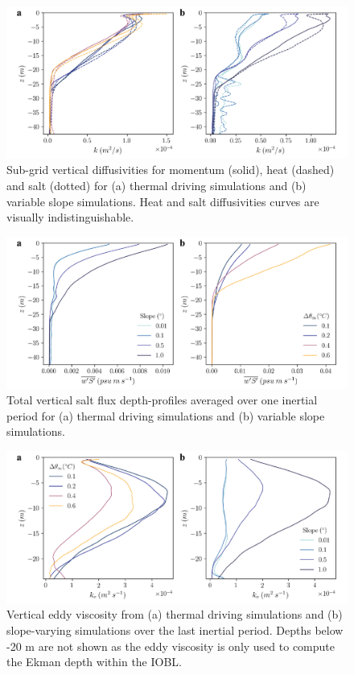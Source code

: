 \documentclass[tc, manuscript]{copernicus}
\begin{document}
\begin{figure}[t]
\includegraphics[width=12cm]{figS4.pdf}
\caption{Sub-grid vertical diffusivities for momentum (solid), heat (dashed) and salt (dotted) for (a) thermal driving simulations and (b) variable slope simulations. Heat and salt diffusivities curves are visually indistinguishable.}
\label{fig:k_all}
\end{figure}

\begin{figure}[t]
\includegraphics[width=12cm]{figS5.pdf}
\caption{Total vertical salt flux depth-profiles averaged over one inertial period for (a) thermal driving simulations and (b) variable slope simulations.}
\label{fig:saltflux}
\end{figure}%

\begin{figure}[t]
\includegraphics[width=12cm]{figS6.pdf}
\caption{Vertical eddy viscosity from (a) thermal driving simulations and (b) slope-varying simulations over the last inertial period. Depths below -20 m are not shown as the eddy viscosity is only used to compute the Ekman depth within the IOBL. }
\label{fig:km}
\end{figure}
\end{document}

